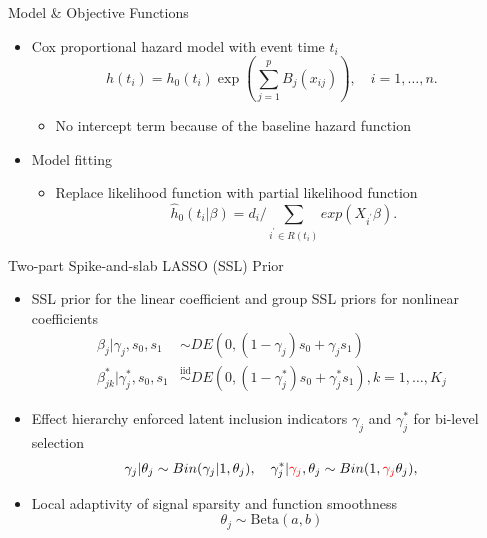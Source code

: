 \documentclass[
  ignorenonframetext,
  aspectratio=169]{beamer}
\providecommand{\tightlist}{%
  \setlength{\itemsep}{0pt}\setlength{\parskip}{0pt}}
\newcommand{\tp}{*}
\newcommand{\simiid}{\overset{\text{iid}}{\sim}}
\newcommand{\bg}[1]{\textcolor{red}{#1}}
\begin{document}
\begin{frame}{Model \& Objective Functions}
\protect\hypertarget{model-objective-functions}{}
\begin{itemize}
\tightlist
\item
  Cox proportional hazard model with event time \(t_i\) \[
  h(t_i) = h_0(t_i)\exp(\sum\limits^p_{j=1}B_j(x_{ij})) , \quad i = 1, \dots, n.
  \]

  \begin{itemize}
  \tightlist
  \item
    No intercept term because of the baseline hazard function
  \end{itemize}
\item
  Model fitting

  \begin{itemize}
  \tightlist
  \item
    Replace likelihood function with partial likelihood function \[
    \hat h_0(t_i|\beta) = d_i/\sum\limits_{i^\prime \in R(t_i)} exp(X_{i^\prime}\beta).
    \]
  \end{itemize}
\end{itemize}
\end{frame}

\begin{frame}{Two-part Spike-and-slab LASSO (SSL) Prior}
\protect\hypertarget{two-part-spike-and-slab-lasso-ssl-prior-1}{}
\begin{itemize}
\tightlist
\item
  SSL prior for the linear coefficient and group SSL priors for
  nonlinear coefficients \begin{align*}
  \beta_{j} |\gamma_{j},s_0,s_1 &\sim DE(0,(1-\gamma_{j}) s_0 + \gamma_{j} s_1) \\
  \beta^\tp_{jk} | \gamma^\tp_{j},s_0,s_1 &\simiid DE(0,(1-\gamma^\tp_{j}) s_0 + \gamma^\tp_{j} s_1), k = 1, \dots, K_j
  \end{align*}
\item
  Effect hierarchy enforced latent inclusion indicators \(\gamma_j\) and
  \(\gamma^\tp_{j}\) for bi-level selection \[
  \gamma_{j} | \theta_j \sim Bin(\gamma_{j}|1, \theta_j),\quad
  \gamma_{j}^\tp | \bg{\gamma_{j}}, \theta_j \sim Bin(1, \bg{\gamma_{j}}\theta_j),
  \]
\item
  Local adaptivity of signal sparsity and function smoothness \[
  \theta_j \sim \text{Beta}(a,b)
  \]
\end{itemize}
\end{frame}
\end{document}

